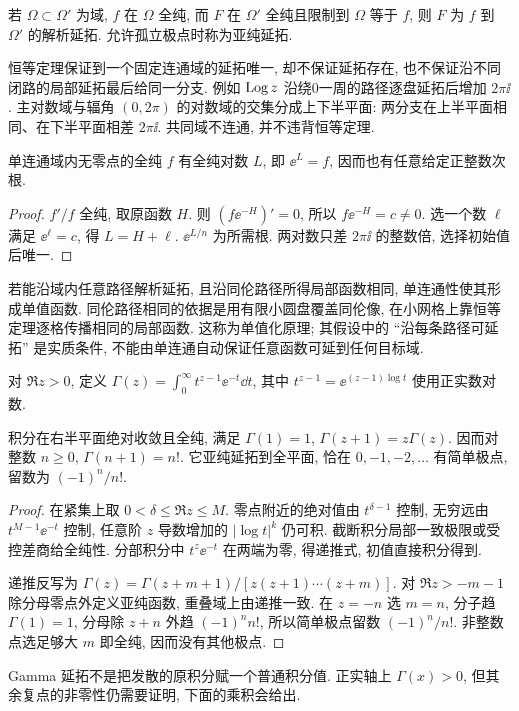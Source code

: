 \begin{definition}
若 $\Omega\subset\Omega'$ 为域, $f$ 在 $\Omega$ 全纯, 而 $F$ 在 $\Omega'$ 全纯且限制到 $\Omega$ 等于 $f$, 则 $F$ 为 $f$ 到 $\Omega'$ 的解析延拓. 允许孤立极点时称为亚纯延拓.
\end{definition}
恒等定理保证到一个固定连通域的延拓唯一, 却不保证延拓存在, 也不保证沿不同闭路的局部延拓最后给同一分支. 例如 $\operatorname{Log} z$ 沿绕0一周的路径逐盘延拓后增加 $2\pi\ii$. 主对数域与辐角 $(0,2\pi)$ 的对数域的交集分成上下半平面: 两分支在上半平面相同、在下半平面相差 $2\pi\ii$. 共同域不连通, 并不违背恒等定理.
\begin{proposition}\label{prop:logexist}
单连通域内无零点的全纯 $f$ 有全纯对数 $L$, 即 $\ee^L=f$, 因而也有任意给定正整数次根.
\end{proposition}
\begin{proof}
$f'/f$ 全纯, 取原函数 $H$. 则 $(f\ee^{-H})'=0$, 所以 $f\ee^{-H}=c\ne0$. 选一个数 $\ell$ 满足 $\ee^\ell=c$, 得 $L=H+\ell$. $\ee^{L/n}$ 为所需根. 两对数只差 $2\pi\ii$ 的整数倍, 选择初始值后唯一.
\end{proof}
若能沿域内任意路径解析延拓, 且沿同伦路径所得局部函数相同, 单连通性使其形成单值函数. 同伦路径相同的依据是用有限小圆盘覆盖同伦像, 在小网格上靠恒等定理逐格传播相同的局部函数. 这称为单值化原理; 其假设中的 ``沿每条路径可延拓'' 是实质条件, 不能由单连通自动保证任意函数可延到任何目标域.

\begin{definition}
对 $\Re z>0$, 定义 $\Gamma(z)=\int_0^\infty t^{z-1}\ee^{-t}\dd t$, 其中 $t^{z-1}=\ee^{(z-1)\log t}$ 使用正实数对数.
\end{definition}
\begin{theorem}
积分在右半平面绝对收敛且全纯, 满足 $\Gamma(1)=1$, $\Gamma(z+1)=z\Gamma(z)$. 因而对整数 $n\ge0$, $\Gamma(n+1)=n!$. 它亚纯延拓到全平面, 恰在 $0,-1,-2,\ldots$ 有简单极点, 留数为 $(-1)^n/n!$.
\end{theorem}
\begin{proof}
在紧集上取 $0<\delta\le\Re z\le M$. 零点附近的绝对值由 $t^{\delta-1}$ 控制, 无穷远由 $t^{M-1}\ee^{-t}$ 控制, 任意阶 $z$ 导数增加的 $|\log t|^k$ 仍可积. 截断积分局部一致极限或受控差商给全纯性. 分部积分中 $t^z\ee^{-t}$ 在两端为零, 得递推式, 初值直接积分得到.

递推反写为 $\Gamma(z)=\Gamma(z+m+1)/[z(z+1)\cdots(z+m)]$. 对 $\Re z>-m-1$ 除分母零点外定义亚纯函数, 重叠域上由递推一致. 在 $z=-n$ 选 $m=n$, 分子趋 $\Gamma(1)=1$, 分母除 $z+n$ 外趋 $(-1)^nn!$, 所以简单极点留数 $(-1)^n/n!$. 非整数点选足够大 $m$ 即全纯, 因而没有其他极点.
\end{proof}
Gamma 延拓不是把发散的原积分赋一个普通积分值. 正实轴上 $\Gamma(x)>0$, 但其余复点的非零性仍需要证明, 下面的乘积会给出.

